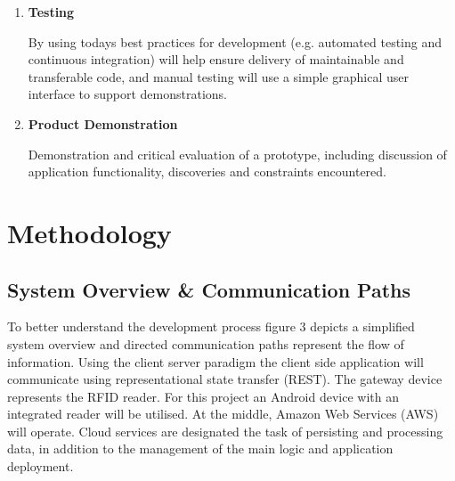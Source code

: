 \documentclass[a4paper, 11pt]{article}
\begin{document}
\begin{enumerate}
  \item \textbf{Testing}
   	\begin{flushleft}By using todays best practices for development (e.g. automated testing and continuous integration) will help ensure delivery of maintainable and transferable code, and manual testing will use a simple graphical user interface to support demonstrations. 
 	\end{flushleft}
 
 \item \textbf{Product Demonstration}
 	\begin{flushleft}Demonstration and critical evaluation of a prototype, including discussion of application functionality, discoveries and constraints encountered. 
 	\end{flushleft}
\end{enumerate}
\clearpage







\section{Methodology}

\subsection{System Overview \& Communication Paths}

To better understand the development process figure 3 depicts a simplified system overview and directed communication paths represent the flow of information. Using the client server paradigm the client side application will communicate using representational state transfer (REST)\cite{REST}. The gateway device represents the RFID reader. For this project an Android device with an integrated reader will be utilised. At the middle, Amazon Web Services (AWS) will operate. Cloud services are designated the task of persisting and processing data, in addition to the management of the main logic and application deployment. 
\end{document}
